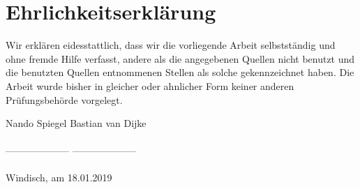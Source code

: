 \section*{Ehrlichkeitserklärung}
Wir erklären eidesstattlich, dass wir die vorliegende Arbeit selbstständig und ohne fremde Hilfe verfasst, andere als die angegebenen Quellen nicht benutzt und die benutzten Quellen entnommenen Stellen als solche gekennzeichnet haben. Die Arbeit wurde bisher in gleicher oder ahnlicher Form keiner anderen Prüfungsbehörde vorgelegt.

Nando Spiegel \vspace{4cm} Bastian van Dijke\\\\
-------------------- \vspace{4cm} -------------------- \\\\



Windisch, am 18.01.2019 